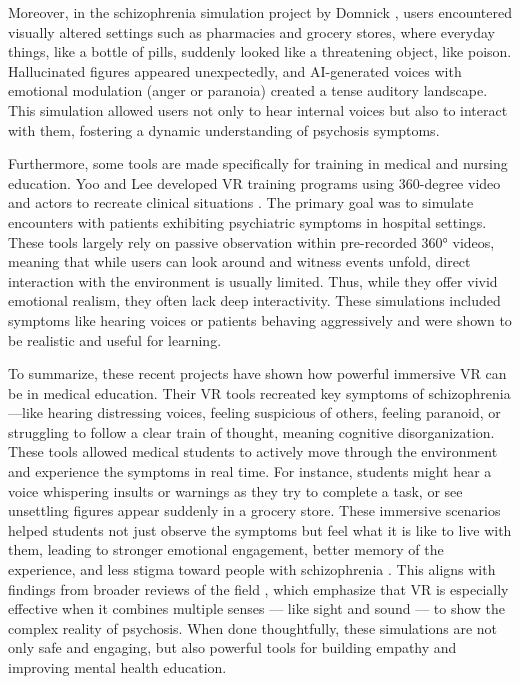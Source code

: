 \vspace{1em}

Moreover, in the schizophrenia simulation project by Domnick \cite{Domnick2023}, users encountered visually altered settings such as pharmacies and grocery stores, where everyday things, like a bottle of pills, suddenly looked like a threatening object, like poison. Hallucinated figures appeared unexpectedly, and AI-generated voices with emotional modulation (anger or paranoia) created a tense auditory landscape. This simulation allowed users not only to hear internal voices but also to interact with them, fostering a dynamic understanding of psychosis symptoms.

\vspace{1em}

Furthermore, some tools are made specifically for training in medical and nursing education. Yoo \cite{Yoo2020} and Lee \cite{Lee2020} developed VR training programs using 360-degree video and actors to recreate clinical situations \cite{Yoo2020, Lee2020}. The primary goal was to simulate encounters with patients exhibiting psychiatric symptoms in hospital settings. These tools largely rely on passive observation within pre-recorded 360° videos, meaning that while users can look around and witness events unfold, direct interaction with the environment is usually limited. Thus, while they offer vivid emotional realism, they often lack deep interactivity. These simulations included symptoms like hearing voices or patients behaving aggressively and were shown to be realistic and useful for learning.

\vspace{1em}

To summarize, these recent projects have shown how powerful immersive VR can be in medical education. Their VR tools recreated key symptoms of schizophrenia—like hearing distressing voices, feeling suspicious of others, feeling paranoid, or struggling to follow a clear train of thought, meaning cognitive disorganization. These tools allowed medical students to actively move through the environment and experience the symptoms in real time. For instance, students might hear a voice whispering insults or warnings as they try to complete a task, or see unsettling figures appear suddenly in a grocery store. These immersive scenarios helped students not just observe the symptoms but feel what it is like to live with them, leading to stronger emotional engagement, better memory of the experience, and less stigma toward people with schizophrenia \cite{Kuhail2022,Domnick2023}. This aligns with findings from broader reviews of the field \cite{Lan2023,Bisso2020}, which emphasize that VR is especially effective when it combines multiple senses — like sight and sound — to show the complex reality of psychosis. When done thoughtfully, these simulations are not only safe and engaging, but also powerful tools for building empathy and improving mental health education.

